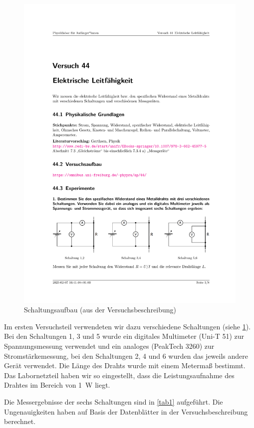 \documentclass[parskip, 12pt, DIV=16, openany]{scrartcl}
\begin{document}
\begin{figure}
\centering
\includegraphics[page=1,trim=3cm 4cm 3cm 21cm,clip]{Versuch 44.pdf}
\caption{Schaltungsaufbau (aus der Versuchsbeschreibung)}\label{fig:schaltungen}
\end{figure}

Im ersten Versuchsteil verwendeten wir dazu verschiedene Schaltungen (siehe \cref{fig:schaltungen}). Bei den Schaltungen 1, 3 und 5 wurde ein digitales Multimeter (Uni-T 51) zur Spannungsmessung verwendet und ein analoges (PeakTech 3260) zur Stromstärkemessung, bei den Schaltungen 2, 4 und 6 wurden das jeweils andere Gerät verwendet. Die Länge des Drahts wurde mit einem Metermaß bestimmt. Das Labornetzteil haben wir so eingestellt, dass die Leistungsaufnahme des Drahtes im Bereich von \SI{1}{\W} liegt.

Die Messergebnisse der sechs Schaltungen sind in \cref{tab1} aufgeführt. Die Ungenauigkeiten haben auf Basis der Datenblätter in der Versuchsbeschreibung berechnet.
\end{document}

